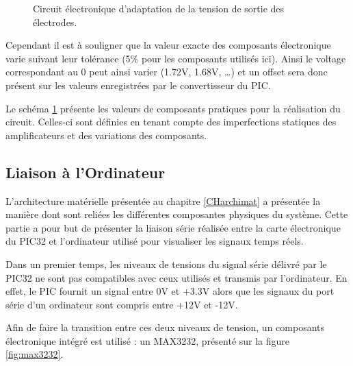 \documentclass[letterpaper, twoside, 12pt, memoire, creativecommons, hyperref]{thETS}
\begin{document}
\begin{figure}
	\centering
	\caption{Circuit électronique d'adaptation de la tension de sortie des électrodes.}
	\label{fig:adapttension}
\end{figure}

Cependant il est à souligner que la valeur exacte des composants électronique varie suivant leur tolérance (5\% pour les composants utilisés ici). Ainsi le voltage correspondant au 0 peut ainsi varier (1.72V, 1.68V, …) et un offset sera donc présent sur les valeurs enregistrées par le convertisseur du PIC. 

Le schéma \ref{fig:adapttension} présente les valeurs de composants pratiques pour la réalisation du circuit. Celles-ci sont définies en tenant compte des imperfections statiques des amplificateurs et des variations des composants.


\subsection{Liaison à l'Ordinateur}

L'architecture matérielle présentée au chapitre \ref{CHarchimat}%
 a présentée la manière dont sont reliées les différentes composantes physiques du système. Cette partie a pour but de présenter la liaison série réalisée entre la carte électronique du PIC32 et l'ordinateur utilisé pour visualiser les signaux temps réels.

Dans un premier temps, les niveaux de tensions du signal série délivré par le PIC32 ne sont pas compatibles avec ceux utilisés et transmis par l'ordinateur. En effet, le PIC fournit un signal entre 0V et +3.3V alors que les signaux du port série d'un ordinateur sont compris entre +12V et -12V. 

Afin de faire la transition entre ces deux niveaux de tension, un composants électronique intégré est utilisé : un MAX3232, présenté sur la figure \ref{fig:max3232}.
\end{document}
